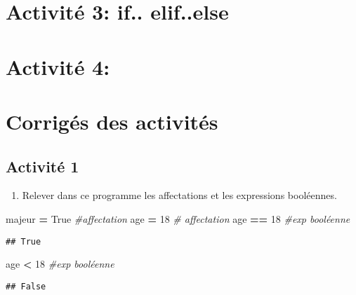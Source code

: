 \documentclass[
]{book}
\newenvironment{Shaded}{\begin{snugshade}}{\end{snugshade}}
\newcommand{\CommentTok}[1]{\textcolor[rgb]{0.56,0.35,0.01}{\textit{#1}}}
\newcommand{\DecValTok}[1]{\textcolor[rgb]{0.00,0.00,0.81}{#1}}
\newcommand{\NormalTok}[1]{#1}
\newcommand{\OperatorTok}[1]{\textcolor[rgb]{0.81,0.36,0.00}{\textbf{#1}}}
\newcommand{\VariableTok}[1]{\textcolor[rgb]{0.00,0.00,0.00}{#1}}
\providecommand{\tightlist}{%
  \setlength{\itemsep}{0pt}\setlength{\parskip}{0pt}}
\def\tightlist{}
\begin{document}
\hypertarget{activituxe9-3-if..-elif..else}{%
\section{Activité 3: if.. elif..else}\label{activituxe9-3-if..-elif..else}}

\hypertarget{activituxe9-4}{%
\section{Activité 4:}\label{activituxe9-4}}

\newpage

\hypertarget{corriguxe9s-des-activituxe9s-1}{%
\section{Corrigés des activités}\label{corriguxe9s-des-activituxe9s-1}}

\hypertarget{activituxe9-1}{%
\subsection{Activité 1}\label{activituxe9-1}}

\begin{enumerate}
\def\labelenumi{\arabic{enumi}.}
\tightlist
\item
  Relever dans ce programme les affectations et les expressions booléennes.
\end{enumerate}

\begin{Shaded}
\begin{Highlighting}[]
\NormalTok{majeur }\OperatorTok{=} \VariableTok{True} \CommentTok{\#affectation}
\NormalTok{age }\OperatorTok{=} \DecValTok{18} \CommentTok{\# affectation}
\NormalTok{age }\OperatorTok{==} \DecValTok{18} \CommentTok{\#exp booléenne}
\end{Highlighting}
\end{Shaded}

\begin{verbatim}
## True
\end{verbatim}

\begin{Shaded}
\begin{Highlighting}[]
\NormalTok{age }\OperatorTok{\textless{}} \DecValTok{18} \CommentTok{\#exp booléenne}
\end{Highlighting}
\end{Shaded}

\begin{verbatim}
## False
\end{verbatim}
\end{document}
